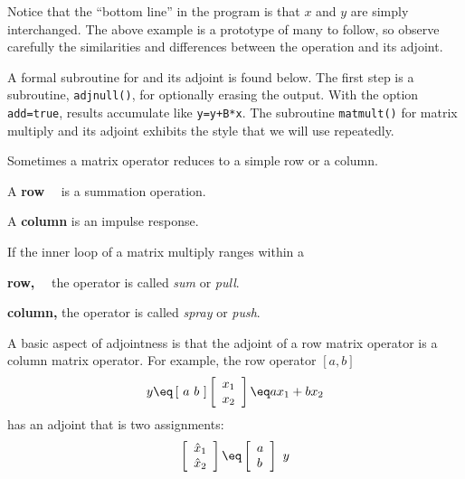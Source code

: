 \noindent
Notice that the ``bottom line'' in the program is that $x$ and $y$
are simply interchanged.
The above example is a prototype of many to follow,
so observe carefully the similarities and differences between the operation
and its adjoint.

\par
A formal subroutine
for  and its adjoint is found below.
The first step is a subroutine, \texttt{adjnull()},
for optionally erasing the output.
With the option {\tt add=true}, results accumulate like {\tt y=y+B*x}.
The subroutine \texttt{matmult()}
for matrix multiply and its adjoint
exhibits the style that we will use repeatedly.

\par
Sometimes a matrix operator reduces to a simple row or a column.

\par\noindent
A {\bf row} \quad\ \ is a summation operation.
\par\noindent
A {\bf column}       is an impulse response.
\vspace{.2in}
\par\noindent
If the inner loop of a matrix multiply ranges within a
\par\noindent
{\bf row,} \quad\ \ the operator is called {\it sum} or {\it pull}.
\par\noindent
{\bf column,}       the operator is called {\it spray} or {\it push}.

\par
A basic aspect of adjointness is that the
adjoint of a row matrix operator is a column matrix operator.
For example,
the row operator $[a,b]$
\begin{equation}
y \eq
\left[ \ a \ b \ \right] 
\left[
\begin{array}{l}
	x_1 \\
	x_2
\end{array}
\right] 
\eq
a x_1 + b x_2
\end{equation}
has an adjoint that is two assignments:
\begin{equation}
	\left[
	\begin{array}{l}
		\hat x_1 \\
		\hat x_2
	\end{array}
	\right]
	\eq
	\left[
	\begin{array}{l}
		a \\
		b
	\end{array}
	\right]
	\ y
\end{equation}
\par
{}

